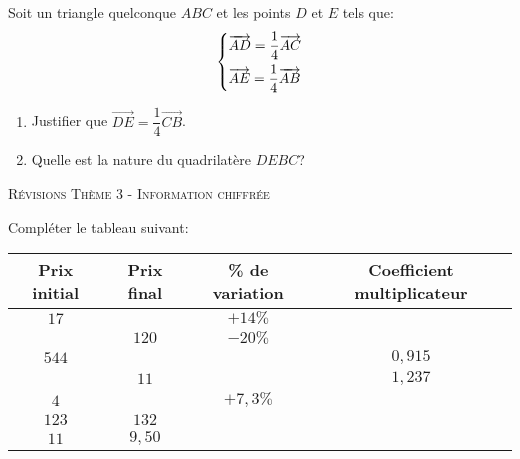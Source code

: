 \documentclass[a4paper]{article}
\renewcommand\euro{\officialeuro\xspace}
\begin{document}
  \begin{exercice}{}{}
      Soit un triangle quelconque $ABC$ et les points $D$ et $E$ tels que:
      $$\begin{dcases}
        \overrightarrow{AD}=\dfrac{1}{4}\overrightarrow{AC} \\
        \overrightarrow{AE}=\dfrac{1}{4}\overrightarrow{AB}
      \end{dcases}$$
  \begin{enumerate}
      \item Justifier que  $\overrightarrow{DE}=\dfrac{1}{4}\overrightarrow{CB}$.
      \item Quelle est la nature du quadrilatère $DEBC$?
  \end{enumerate}  
  
      
  \end{exercice}
  
  
  \pagebreak
  

  

\begin{center}
    {\scshape\LARGE Révisions Thème 3 - Information chiffrée\par}
    \vspace{0.5cm}
  \end{center}
  
  
  
  
  
  \medskip
  
  \begin{exerciceinterro}{}{}
  Compléter le tableau suivant:
  
  \begin{center}
    \begin{tabular}{|c|c|c|c|}
      \hline 
      \cellcolor{Blue!15!white}\textbf{Prix initial} & \cellcolor{Blue!15!white}\textbf{Prix final} & \cellcolor{Blue!15!white}\textbf{\% de variation} & \cellcolor{Blue!15!white}\textbf{Coefficient multiplicateur} \\
      \hline
      $17$\euro & & $+14\%$ & \\
      \hline
      & $120$\euro&  $-20\%$& \\
      \hline
      $544$\euro& & & $0,915$\\
      \hline
      & $11$\euro& & $1,237$\\
      \hline
      $4$\euro& & $+7,3\%$& \\
      \hline
      $123$\euro& $132$\euro & & \\
      \hline
      $11$\euro& $9,50$\euro& & \\
      \hline
    \end{tabular}
  \end{center}
      
  \end{exerciceinterro}
  
\end{document}
